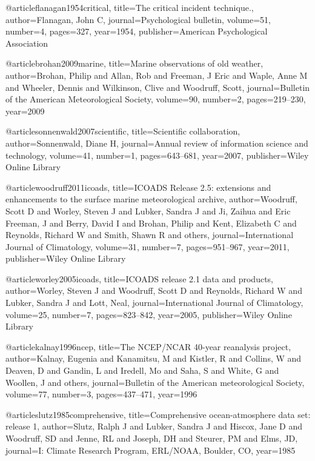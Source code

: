 @article{flanagan1954critical,
  title={The critical incident technique.},
  author={Flanagan, John C},
  journal={Psychological bulletin},
  volume={51},
  number={4},
  pages={327},
  year={1954},
  publisher={American Psychological Association}
}

@article{brohan2009marine,
  title={Marine observations of old weather},
  author={Brohan, Philip and Allan, Rob and Freeman, J Eric and Waple, Anne M and Wheeler, Dennis and Wilkinson, Clive and Woodruff, Scott},
  journal={Bulletin of the American Meteorological Society},
  volume={90},
  number={2},
  pages={219--230},
  year={2009}
}

@article{sonnenwald2007scientific,
  title={Scientific collaboration},
  author={Sonnenwald, Diane H},
  journal={Annual review of information science and technology},
  volume={41},
  number={1},
  pages={643--681},
  year={2007},
  publisher={Wiley Online Library}
}



@article{woodruff2011icoads,
  title={ICOADS Release 2.5: extensions and enhancements to the surface marine meteorological archive},
  author={Woodruff, Scott D and Worley, Steven J and Lubker, Sandra J and Ji, Zaihua and Eric Freeman, J and Berry, David I and Brohan, Philip and Kent, Elizabeth C and Reynolds, Richard W and Smith, Shawn R and others},
  journal={International Journal of Climatology},
  volume={31},
  number={7},
  pages={951--967},
  year={2011},
  publisher={Wiley Online Library}
}

@article{worley2005icoads,
  title={ICOADS release 2.1 data and products},
  author={Worley, Steven J and Woodruff, Scott D and Reynolds, Richard W and Lubker, Sandra J and Lott, Neal},
  journal={International Journal of Climatology},
  volume={25},
  number={7},
  pages={823--842},
  year={2005},
  publisher={Wiley Online Library}
 }
 
 @article{kalnay1996ncep,
  title={The NCEP/NCAR 40-year reanalysis project},
  author={Kalnay, Eugenia and Kanamitsu, M and Kistler, R and Collins, W and Deaven, D and Gandin, L and Iredell, Mo and Saha, S and White, G and Woollen, J and others},
  journal={Bulletin of the American meteorological Society},
  volume={77},
  number={3},
  pages={437--471},
  year={1996}
}

@article{slutz1985comprehensive,
  title={Comprehensive ocean-atmosphere data set: release 1},
  author={Slutz, Ralph J and Lubker, Sandra J and Hiscox, Jane D and Woodruff, SD and Jenne, RL and Joseph, DH and Steurer, PM and Elms, JD},
  journal={I: Climate Research Program, ERL/NOAA, Boulder, CO},
  year={1985}
}

